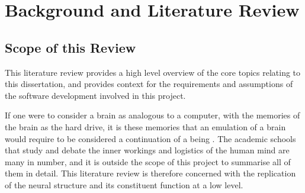 \chapter{Background and Literature Review}


\section{Scope of this Review}
This literature review provides a high level overview of the core topics relating to this dissertation, and provides context for the requirements and assumptions of the software development involved in this project. 

If one were to consider a brain as analogous to a computer, with the memories of
the brain as the hard drive, it is these memories that an  emulation of a brain
would require to be considered a continuation of a being
\autocite{eichenbaum_cognitive_2011}. The academic schools that study and debate
the inner workings and logistics of the human mind are many in number, and it is
outside the scope of this project to summarise all of them in detail.  This
literature review is therefore concerned with the replication of the neural
structure and its constituent function at a low level.








